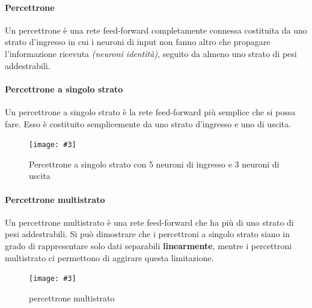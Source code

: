 \documentclass[12pt, twoside, letterpaper]{report}
\newcommand{\img}[4] {
	\begin{figure}[h]
		\caption{#1}
		\centering
		\texttt{[image: \#3]}\\
		\label{#4}
	\end{figure}
}
\begin{document}
			\paragraph{Percettrone} Un percettrone è una rete feed-forward completamente connessa costituita da uno strato d'ingresso in cui i neuroni di input non fanno altro che propagare l'informazione ricevuta \textit{(neuroni identità)}, seguito  da almeno uno strato di pesi addestrabili.
			
			\paragraph{Percettrone a singolo strato} Un percettrone a singolo strato è la rete feed-forward più semplice che si possa fare. Esso è costituito semplicemente da uno strato d'ingresso e uno di uscita. 
				\img{Percettrone a singolo strato con 5 neuroni di ingresso e 3 neuroni di uscita}{0.5}{slp.png}{slp}
				
			\paragraph{Percettrone multistrato} Un percettrone multistrato è una rete feed-forward che ha più di uno strato di pesi addestrabili. Si può dimostrare che i percettroni a singolo strato siano in grado di rappresentare solo dati separabili \textbf{linearmente}, mentre i percettroni multistrato ci permettono di aggirare questa limitazione. 
				\img{percettrone multistrato}{0.5}{nn-feed-forward.png}{feedforward}
		
\end{document}
